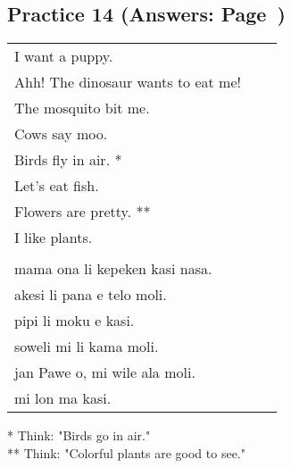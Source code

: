 \subsection*{Practice 14 (Answers: Page~\pageref{'living_things'})}
%
\begin{supertabular}{p{5,5cm}|ll}
   I want a puppy. &&   \\ %
   Ahh! The dinosaur wants to eat me!  &&  \\ %
   The mosquito bit me.  &&  \\ %
   Cows say moo.  &&  \\ %
   Birds fly in air. * &&  \\ %
   Let's eat fish.  &&  \\ %
   Flowers are pretty. ** &&  \\ %
   I like plants. &&   \\ %
 && \\ %
   mama ona li kepeken kasi nasa.  &&  \\ %
   akesi li pana e telo moli. &&  \\  %
   pipi li moku e kasi.  &&  \\ %
   soweli mi li kama moli.  &&  \\ %
   jan Pawe o, mi wile ala moli. && \\   %
   mi lon ma kasi. &&   \\ %
\end{supertabular} 

* Think: "Birds go in air." \\
** Think: "Colorful plants are good to see." 
